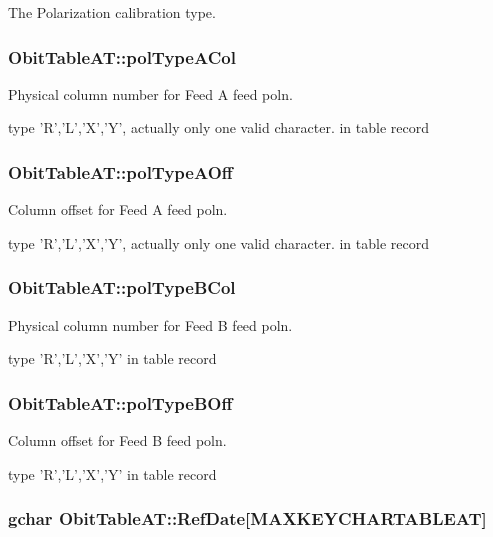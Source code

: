 The Polarization calibration type. 

\subsubsection{ {\bf Obit\-Table\-AT::pol\-Type\-ACol}}\label{structObitTableAT_o39}


Physical column number for Feed A feed poln. 

type 'R','L','X','Y', actually only one valid character. in table record 
\subsubsection{ {\bf Obit\-Table\-AT::pol\-Type\-AOff}}\label{structObitTableAT_o38}


Column offset for Feed A feed poln. 

type 'R','L','X','Y', actually only one valid character. in table record 
\subsubsection{ {\bf Obit\-Table\-AT::pol\-Type\-BCol}}\label{structObitTableAT_o41}


Physical column number for Feed B feed poln. 

type 'R','L','X','Y' in table record 
\subsubsection{ {\bf Obit\-Table\-AT::pol\-Type\-BOff}}\label{structObitTableAT_o40}


Column offset for Feed B feed poln. 

type 'R','L','X','Y' in table record 
\subsubsection{\setlength{\rightskip}{0pt plus 5cm}gchar {\bf Obit\-Table\-AT::Ref\-Date}[MAXKEYCHARTABLEAT]}\label{structObitTableAT_o17}


